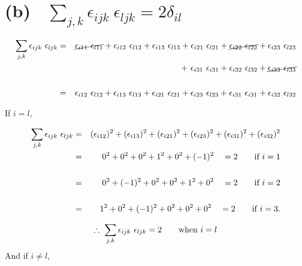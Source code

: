 \documentclass[a4paper]{article}
\begin{document}
\section*{(b)  $ {\sum\limits_{j,k}} \epsilon_{ijk} \ \epsilon_{ljk} = 2\delta_{il}$} 

\begin{eqnarray*}
	\sum_{j,k} \epsilon_{ijk} \ \epsilon_{ljk} & = & \cancel{\epsilon_{i11} \ \epsilon_{l11}} + \epsilon_{i12} \ \epsilon_{l12} + \epsilon_{i13} \ \epsilon_{l13} + \epsilon_{i21} \ \epsilon_{l21} + \cancel{\epsilon_{i22} \ \epsilon_{l22}} + \epsilon_{i23} \ \epsilon_{l23} \\
	&  & + \ \epsilon_{i31} \ \epsilon_{i31} + \epsilon_{i32} \ \epsilon_{l32} + \cancel{\epsilon_{i33} \ \epsilon_{l33}} \\\\
	& = & \epsilon_{i12} \ \epsilon_{l12} + \epsilon_{i13} \ \epsilon_{l13} + \epsilon_{i21} \ \epsilon_{l21} + \epsilon_{i23} \ \epsilon_{l23} + \epsilon_{i31} \ \epsilon_{i31} + \epsilon_{i32} \ \epsilon_{l32}
\end{eqnarray*}

If $i = l$,

\begin{eqnarray*}
	\sum_{j,k} \epsilon_{ijk} \ \epsilon_{ljk} & = & (\epsilon_{i12})^2 + (\epsilon_{i13})^2 + (\epsilon_{i21})^2 + (\epsilon_{i23})^2 + (\epsilon_{i31})^2 + (\epsilon_{i32})^2 \\
	& = & 0^2 + 0^2 + 0^2 + 1^2 + 0^2 + (-1)^2 \quad = 2 \text{\qquad if $i = 1$} \\\\
	& = & 0^2 + (-1)^2 + 0^2 + 0^2 + 1^2 + 0^2 \quad = 2 \text{\qquad if $i = 2$} \\\\
	& = & 1^2 + 0^2 + (-1)^2 + 0^2 + 0^2 + 0^2 \quad = 2 \text{\qquad if $i = 3$}.
\end{eqnarray*}

\begin{equation*}
	\therefore \ \sum_{j,k} \epsilon_{ijk} \ \epsilon_{ljk} = 2 \text{\qquad when $i = l$}
\end{equation*}
And if $i \neq l$,
\end{document}
